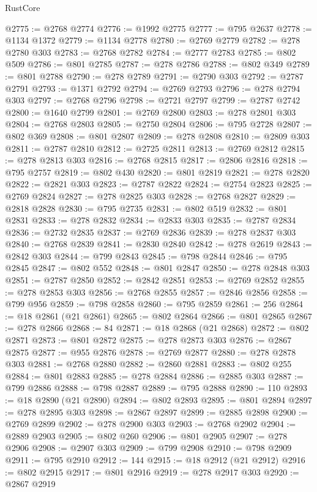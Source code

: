 \begin{lexlean}{RustCore}
\begin{coremodule}
@2775 := @2768 @2774
@2776 := @1992 @2775
@2777 := @795 @2637
@2778 := @1134 @1372
@2779 := @1134 @2778
@2780 := @2769 @2779
@2782 := @278 @2780 @303
@2783 := @2768 @2782
@2784 := @2777 @2783
@2785 := @802 @509
@2786 := @801 @2785
@2787 := @278 @2786
@2788 := @802 @349
@2789 := @801 @2788
@2790 := @278 @2789
@2791 := @2790 @303
@2792 := @2787 @2791
@2793 := @1371 @2792
@2794 := @2769 @2793
@2796 := @278 @2794 @303
@2797 := @2768 @2796
@2798 := @2721 @2797
@2799 := @2787 @2742
@2800 := @1640 @2799
@2801 := @2769 @2800
@2803 := @278 @2801 @303
@2804 := @2768 @2803
@2805 := @2750 @2804
@2806 := @795 @2728
@2807 := @802 @369
@2808 := @801 @2807
@2809 := @278 @2808
@2810 := @2809 @303
@2811 := @2787 @2810
@2812 := @2725 @2811
@2813 := @2769 @2812
@2815 := @278 @2813 @303
@2816 := @2768 @2815
@2817 := @2806 @2816
@2818 := @795 @2757
@2819 := @802 @430
@2820 := @801 @2819
@2821 := @278 @2820
@2822 := @2821 @303
@2823 := @2787 @2822
@2824 := @2754 @2823
@2825 := @2769 @2824
@2827 := @278 @2825 @303
@2828 := @2768 @2827
@2829 := @2818 @2828
@2830 := @795 @2735
@2831 := @802 @519
@2832 := @801 @2831
@2833 := @278 @2832
@2834 := @2833 @303
@2835 := @2787 @2834
@2836 := @2732 @2835
@2837 := @2769 @2836
@2839 := @278 @2837 @303
@2840 := @2768 @2839
@2841 := @2830 @2840
@2842 := @278 @2619
@2843 := @2842 @303
@2844 := @799 @2843
@2845 := @798 @2844
@2846 := @795 @2845
@2847 := @802 @552
@2848 := @801 @2847
@2850 := @278 @2848 @303
@2851 := @2787 @2850
@2852 := @2842 @2851
@2853 := @2769 @2852
@2855 := @278 @2853 @303
@2856 := @2768 @2855
@2857 := @2846 @2856
@2858 := @799 @956
@2859 := @798 @2858
@2860 := @795 @2859
@2861 := 256
@2864 := @18 @2861 (@21 @2861)
@2865 := @802 @2864
@2866 := @801 @2865
@2867 := @278 @2866
@2868 := 84
@2871 := @18 @2868 (@21 @2868)
@2872 := @802 @2871
@2873 := @801 @2872
@2875 := @278 @2873 @303
@2876 := @2867 @2875
@2877 := @955 @2876
@2878 := @2769 @2877
@2880 := @278 @2878 @303
@2881 := @2768 @2880
@2882 := @2860 @2881
@2883 := @802 @255
@2884 := @801 @2883
@2885 := @278 @2884
@2886 := @2885 @303
@2887 := @799 @2886
@2888 := @798 @2887
@2889 := @795 @2888
@2890 := 110
@2893 := @18 @2890 (@21 @2890)
@2894 := @802 @2893
@2895 := @801 @2894
@2897 := @278 @2895 @303
@2898 := @2867 @2897
@2899 := @2885 @2898
@2900 := @2769 @2899
@2902 := @278 @2900 @303
@2903 := @2768 @2902
@2904 := @2889 @2903
@2905 := @802 @260
@2906 := @801 @2905
@2907 := @278 @2906
@2908 := @2907 @303
@2909 := @799 @2908
@2910 := @798 @2909
@2911 := @795 @2910
@2912 := 144
@2915 := @18 @2912 (@21 @2912)
@2916 := @802 @2915
@2917 := @801 @2916
@2919 := @278 @2917 @303
@2920 := @2867 @2919

\end{coremodule}
\end{lexlean}
